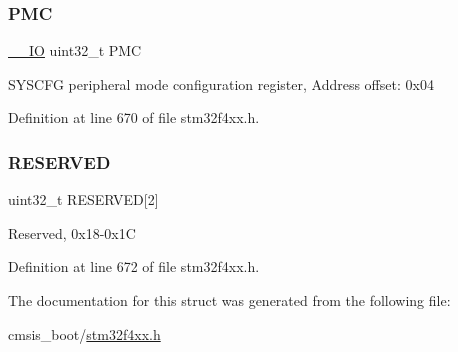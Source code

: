 \mbox{\label{struct_s_y_s_c_f_g___type_def_a2130abf1fefb63ce4c4b138fd8c9822a}} 
\subsubsection{\texorpdfstring{P\+MC}{PMC}}
{\footnotesize\ttfamily \hyperlink{group___c_m_s_i_s__core__definitions_gaec43007d9998a0a0e01faede4133d6be}{\+\_\+\+\_\+\+IO} uint32\+\_\+t P\+MC}

S\+Y\+S\+C\+FG peripheral mode configuration register, Address offset\+: 0x04 

Definition at line 670 of file stm32f4xx.\+h.

\mbox{\label{struct_s_y_s_c_f_g___type_def_afaf27b66c1edc60064db3fa6e693fb59}} 
\subsubsection{\texorpdfstring{R\+E\+S\+E\+R\+V\+ED}{RESERVED}}
{\footnotesize\ttfamily uint32\+\_\+t R\+E\+S\+E\+R\+V\+ED\mbox{[}2\mbox{]}}

Reserved, 0x18-\/0x1C 

Definition at line 672 of file stm32f4xx.\+h.



The documentation for this struct was generated from the following file\+:\begin{DoxyCompactItemize}
\item 
cmsis\+\_\+boot/\hyperlink{stm32f4xx_8h}{stm32f4xx.\+h}\end{DoxyCompactItemize}
